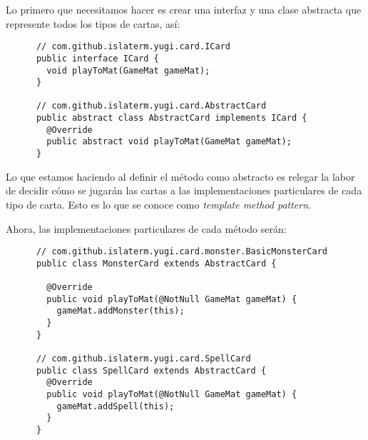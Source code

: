 \begin{Answer}[ref={ex:template-1}]
    Lo primero que necesitamos hacer es crear una interfaz y una clase abstracta que 
    represente todos los tipos de cartas, así:
    \begin{verbatim}
      // com.github.islaterm.yugi.card.ICard
      public interface ICard {
        void playToMat(GameMat gameMat);
      }

      // com.github.islaterm.yugi.card.AbstractCard
      public abstract class AbstractCard implements ICard {
        @Override
        public abstract void playToMat(GameMat gameMat);
      }
    \end{verbatim}

    Lo que estamos haciendo al definir el método como abstracto es relegar la labor de 
    decidir cómo se jugarán las cartas a las implementaciones particulares de cada tipo de
    carta.
    Esto es lo que se conoce como \textit{template method pattern}.

    Ahora, las implementaciones particulares de cada método serán:
    \begin{verbatim}
      // com.github.islaterm.yugi.card.monster.BasicMonsterCard
      public class MonsterCard extends AbstractCard {

        @Override
        public void playToMat(@NotNull GameMat gameMat) {
          gameMat.addMonster(this);
        }
      }

      // com.github.islaterm.yugi.card.SpellCard
      public class SpellCard extends AbstractCard {
        @Override
        public void playToMat(@NotNull GameMat gameMat) {
          gameMat.addSpell(this);
        }
      }
    \end{verbatim}
  \end{Answer}
  
